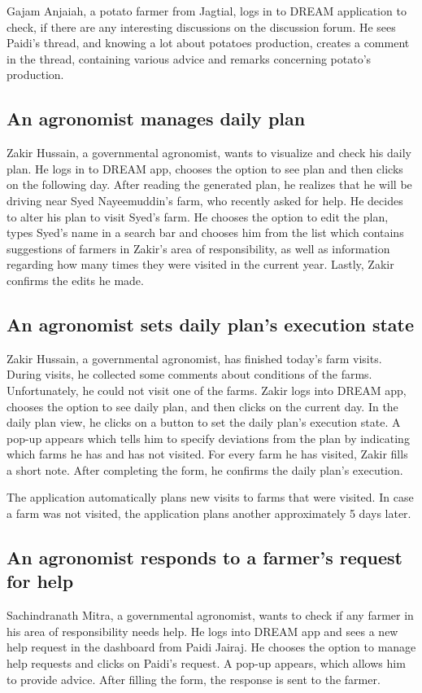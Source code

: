 Gajam Anjaiah, a potato farmer from Jagtial, logs in to DREAM application to check, if there are any interesting discussions on the discussion forum. He sees Paidi's thread, and knowing a lot about potatoes production, creates a comment in the thread, containing various advice and remarks concerning potato's production.

\subsection*{An agronomist manages daily plan}
Zakir Hussain, a governmental agronomist, wants to visualize and check his daily plan. He logs in to DREAM app, chooses the option to see plan and then clicks on the following day. After reading the generated plan, he realizes that he will be driving near Syed Nayeemuddin's farm, who recently asked for help. He decides to alter his plan to visit Syed's farm. He chooses the option to edit the plan, types Syed's name in a search bar and chooses him from the list which contains suggestions of farmers in Zakir's area of responsibility, as well as information regarding how many times they were visited in the current year. Lastly, Zakir confirms the edits he made.

\subsection*{An agronomist sets daily plan's execution state}
Zakir Hussain, a governmental agronomist, has finished today's farm visits. During visits, he collected some comments about conditions of the farms. Unfortunately, he could not visit one of the farms. Zakir logs into DREAM app, chooses the option to see daily plan, and then clicks on the current day. In the daily plan view, he clicks on a button to set the daily plan's execution state. A pop-up appears which tells him to specify deviations from the plan by indicating which farms he has and has not visited. For every farm he has visited, Zakir fills a short note. After completing the form, he confirms the daily plan's execution.

The application automatically plans new visits to farms that were visited. In case a farm was not visited, the application plans another approximately 5 days later.

\subsection*{An agronomist responds to a farmer’s request for help} 
Sachindranath Mitra, a governmental agronomist, wants to check if any farmer in his area of responsibility needs help. He logs into DREAM app and sees a new help request in the dashboard from Paidi Jairaj. He chooses the option to manage help requests and clicks on Paidi's request. A pop-up appears, which allows him to provide advice. After filling the form, the response is sent to the farmer.

